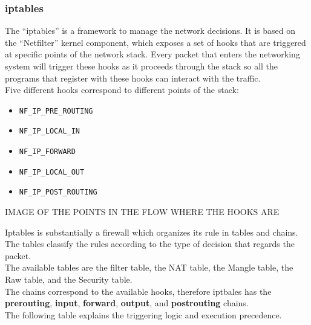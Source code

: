 \documentclass[]{article}
\begin{document}
	\subsubsection{iptables}

	The ``iptables'' is a framework to manage the network decisions. It is based on the ``Netfilter'' kernel component, which exposes a set of hooks that are triggered at specific points of the network stack. Every packet that enters the networking system will trigger these hooks as it proceeds through the stack so all the programs that register with these hooks can interact with the traffic.\\
	Five different hooks correspond to different points of the stack:\\

	\begin{itemize}
		\item \lstinline{NF_IP_PRE_ROUTING}
		\item \lstinline{NF_IP_LOCAL_IN}
		\item \lstinline{NF_IP_FORWARD}
		\item \lstinline{NF_IP_LOCAL_OUT}
		\item \lstinline{NF_IP_POST_ROUTING}
	\end{itemize}

	IMAGE OF THE POINTS IN THE FLOW WHERE THE HOOKS ARE
	
	Iptables is substantially a firewall which organizes its rule in tables and chains. The tables classify the rules according to the type of decision that regards the packet.\\
	The available tables are the filter table, the NAT table, the Mangle table, the Raw table, and the Security table.\\
	The chains correspond to the available hooks, therefore iptbales has the \textbf{prerouting}, \textbf{input}, \textbf{forward}, \textbf{output}, and \textbf{postrouting} chains.\\
	The following table explains the triggering logic and execution precedence.\\
\end{document}
